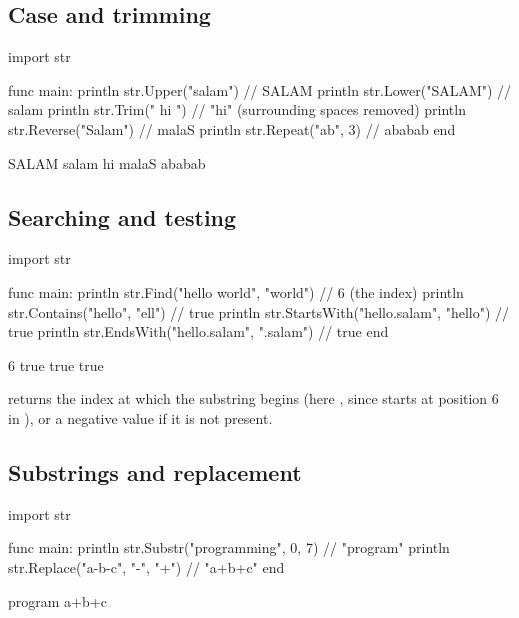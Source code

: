 \subsection{Case and trimming}

\begin{salamen}
import str

func main:
    println str.Upper("salam")        // SALAM
    println str.Lower("SALAM")        // salam
    println str.Trim("   hi   ")      // "hi" (surrounding spaces removed)
    println str.Reverse("Salam")      // malaS
    println str.Repeat("ab", 3)       // ababab
end
\end{salamen}

\begin{progout}
SALAM
salam
hi
malaS
ababab
\end{progout}

\subsection{Searching and testing}

\begin{salamen}
import str

func main:
    println str.Find("hello world", "world")       // 6 (the index)
    println str.Contains("hello", "ell")           // true
    println str.StartsWith("hello.salam", "hello") // true
    println str.EndsWith("hello.salam", ".salam")  // true
end
\end{salamen}

\begin{progout}
6
true
true
true
\end{progout}

 returns the index at which the substring begins (here ,
since  starts at position 6 in ), or a negative
value if it is not present.

\subsection{Substrings and replacement}

\begin{salamen}
import str

func main:
    println str.Substr("programming", 0, 7)    // "program"
    println str.Replace("a-b-c", "-", "+")     // "a+b+c"
end
\end{salamen}

\begin{progout}
program
a+b+c
\end{progout}

